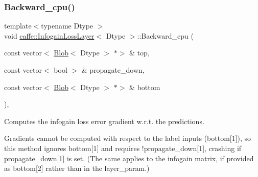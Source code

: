 \subsubsection{\texorpdfstring{Backward\+\_\+cpu()}{Backward\_cpu()}\hspace{0.1cm}{\footnotesize\ttfamily [1/2]}}
{\footnotesize\ttfamily template$<$typename Dtype $>$ \\
void \mbox{\hyperlink{classcaffe_1_1_infogain_loss_layer}{caffe\+::\+Infogain\+Loss\+Layer}}$<$ Dtype $>$\+::Backward\+\_\+cpu (\begin{DoxyParamCaption}\item[{const vector$<$ \mbox{\hyperlink{classcaffe_1_1_blob}{Blob}}$<$ Dtype $>$ $\ast$$>$ \&}]{top,  }\item[{const vector$<$ bool $>$ \&}]{propagate\+\_\+down,  }\item[{const vector$<$ \mbox{\hyperlink{classcaffe_1_1_blob}{Blob}}$<$ Dtype $>$ $\ast$$>$ \&}]{bottom }\end{DoxyParamCaption})\hspace{0.3cm}{\ttfamily [protected]}, {\ttfamily [virtual]}}



Computes the infogain loss error gradient w.\+r.\+t. the predictions. 

Gradients cannot be computed with respect to the label inputs (bottom\mbox{[}1\mbox{]}), so this method ignores bottom\mbox{[}1\mbox{]} and requires !propagate\+\_\+down\mbox{[}1\mbox{]}, crashing if propagate\+\_\+down\mbox{[}1\mbox{]} is set. (The same applies to the infogain matrix, if provided as bottom\mbox{[}2\mbox{]} rather than in the layer\+\_\+param.)


